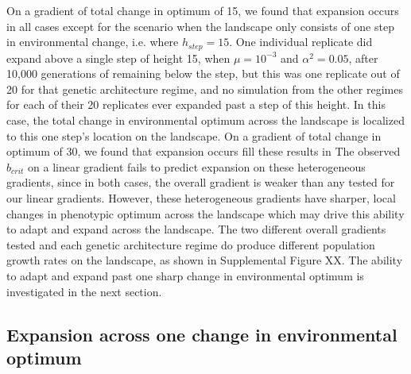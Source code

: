 On a gradient of total change in optimum of 15, we found that expansion occurs in all cases except for the scenario when the landscape only consists of one step in environmental change, i.e. where $h_{step} = 15$. One individual replicate did expand above a single step of height 15, when $\mu = 10^{-3}$ and $\alpha^2 = 0.05$, after 10,000 generations of remaining below the step, but this was one replicate out of 20 for that genetic architecture regime, and no simulation from the other regimes for each of their 20 replicates ever expanded past a step of this height. In this case, the total change in environmental optimum across the landscape is localized to this one step's location on the landscape. On a gradient of total change in optimum of 30, we found that expansion occurs
%
\color{red} fill these results in \color{black} 
%
The observed $b_{crit}$ on a linear gradient fails to predict expansion on these heterogeneous gradients, since in both cases, the overall gradient is weaker than any tested for our linear gradients. However, these heterogeneous gradients have sharper, local changes in phenotypic optimum across the landscape which may drive this ability to adapt and expand across the landscape. The two different overall gradients tested and each genetic architecture regime do produce different population growth rates on the landscape, as shown in \color{red}Supplemental Figure XX\color{black}. The ability to adapt and expand past one sharp change in environmental optimum is investigated in the next section.




\subsection{Expansion across one change in environmental optimum}


